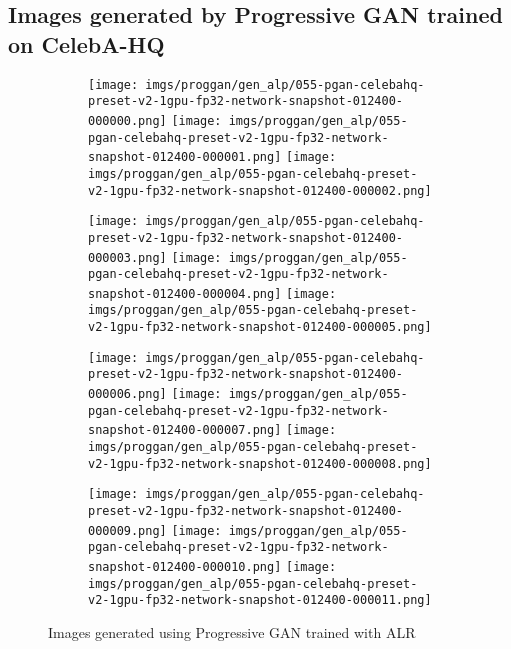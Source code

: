 \documentclass{article}
\begin{document}
\subsection{Images generated by Progressive GAN trained on CelebA-HQ} \label{proggan}
\begin{figure}[h]
  \begin{subfigure}{\linewidth}
  \texttt{[image: imgs/proggan/gen\_alp/055-pgan-celebahq-preset-v2-1gpu-fp32-network-snapshot-012400-000000.png]}
  \texttt{[image: imgs/proggan/gen\_alp/055-pgan-celebahq-preset-v2-1gpu-fp32-network-snapshot-012400-000001.png]}
  \texttt{[image: imgs/proggan/gen\_alp/055-pgan-celebahq-preset-v2-1gpu-fp32-network-snapshot-012400-000002.png]}
  \end{subfigure}\par
  \begin{subfigure}{\linewidth}
  \texttt{[image: imgs/proggan/gen\_alp/055-pgan-celebahq-preset-v2-1gpu-fp32-network-snapshot-012400-000003.png]}
  \texttt{[image: imgs/proggan/gen\_alp/055-pgan-celebahq-preset-v2-1gpu-fp32-network-snapshot-012400-000004.png]}
  \texttt{[image: imgs/proggan/gen\_alp/055-pgan-celebahq-preset-v2-1gpu-fp32-network-snapshot-012400-000005.png]}
  \end{subfigure}\par
  \begin{subfigure}{\linewidth}
  \texttt{[image: imgs/proggan/gen\_alp/055-pgan-celebahq-preset-v2-1gpu-fp32-network-snapshot-012400-000006.png]}
  \texttt{[image: imgs/proggan/gen\_alp/055-pgan-celebahq-preset-v2-1gpu-fp32-network-snapshot-012400-000007.png]}
  \texttt{[image: imgs/proggan/gen\_alp/055-pgan-celebahq-preset-v2-1gpu-fp32-network-snapshot-012400-000008.png]}
  \end{subfigure}
  \begin{subfigure}{\linewidth}
  \texttt{[image: imgs/proggan/gen\_alp/055-pgan-celebahq-preset-v2-1gpu-fp32-network-snapshot-012400-000009.png]}
  \texttt{[image: imgs/proggan/gen\_alp/055-pgan-celebahq-preset-v2-1gpu-fp32-network-snapshot-012400-000010.png]}
  \texttt{[image: imgs/proggan/gen\_alp/055-pgan-celebahq-preset-v2-1gpu-fp32-network-snapshot-012400-000011.png]}
  \end{subfigure}
  \caption{Images generated using Progressive GAN trained with ALR}
  \label{proggan_alp}
\end{figure}
\end{document}
